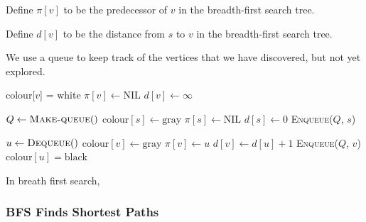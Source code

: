 Define $\pi[v]$ to be the predecessor of $v$ in the breadth-first search tree.

Define $d[v]$ to be the distance from $s$ to $v$ in the breadth-first search tree.

We use a queue to keep track of the vertices that we have discovered, but not yet explored.

\clearpage

\begin{algorithm}[H] \begin{algorithmic}[1]
        \State {}
            \State colour[$v$] = white
            \State $\pi[v] \gets \text{NIL}$
            \State $d[v] \gets \infty$
        \EndFor

        \State {}
        \State $Q \gets \textsc{Make-queue}()$
        \State $\text{colour}[s] \gets \text{gray}$
        \State $\pi[s] \gets \text{NIL}$
        \State $d[s] \gets 0$
        \State \textsc{Enqueue}($Q$, $s$)

        \State {}
            \State $u \gets \textsc{Dequeue}()$
                    \State $\text{colour}[v] \gets \text{gray}$
                    \State $\pi[v] \gets u$
                    \State $d[v] \gets d[u] + 1$
                    \State \textsc{Enqueue}($Q$, $v$)
                \EndIf
            \EndFor
            \State $\text{colour}[u] = \text{black}$
        \EndWhile
    \EndProcedure
\end{algorithmic} \end{algorithm}

In breath first search, 

\subsubsection*{BFS Finds Shortest Paths}

